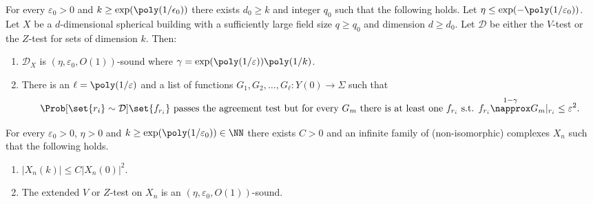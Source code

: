 \begin{corollary} \label{cor:spherical-building-agreement-expansion}
    For every \(\varepsilon_0 > 0\) and \(k \geq \exp(\poly(1/\epsilon_0))\) there exists \(d_0 \geq k\) and integer \(q_0\) such that the following holds. Let \(\eta \leq \exp(-\poly(1/\varepsilon_0))\). Let \(X\) be a \(d\)-dimensional spherical building with a sufficiently large field size \(q \geq q_0\) and dimension \(d\geq d_0\). Let \(\mathcal{D}\) be either the \(V\)-test or the \(Z\)-test for sets of dimension \(k\). Then:
    \begin{enumerate}
        \item \(\mathcal{D}_X\) is \((\eta, \varepsilon_0, O(1))\)-sound where \(\gamma = \exp(\poly(1/\varepsilon))\poly(1/k)\).
        \item There is an \(\ell = \poly(1/\varepsilon)\) and a list of functions \(G_1,G_2,\dots,G_\ell:Y(0) \to \Sigma\) such that
    \begin{equation} \label{eq:list-explains-most-of-the-agreement}
        \Prob[\set{r_i} \sim \mathcal{D}]{\text{\(\set{f_{r_i}}\) passes the agreement test but for every \(G_m\) there is at least one \(f_{r_i}\) s.t. \(f_{r_i} \overset{1-\gamma}{\napprox} G_m|_{r_i}\)} } \leq \varepsilon^2.
    \end{equation}
    \end{enumerate} %
\end{corollary}

\begin{corollary} \label{cor:existance-of-sparse-agreement-tests}
    For every \(\varepsilon_0> 0\), \(\eta > 0\) and \(k \geq \exp(\poly(1/\varepsilon_0)) \in \NN\) there exists \(C>0\) and an infinite family of (non-isomorphic) complexes \(X_n\) such that the following holds.
    \begin{enumerate}
        \item \(|X_n(k)| \leq C|X_n(0)|^2\).
        \item The extended \(V\) or \(Z\)-test on \(X_n\) is an \((\eta,\varepsilon_0,O(1))\)-sound.
    \end{enumerate}
\end{corollary}
 
